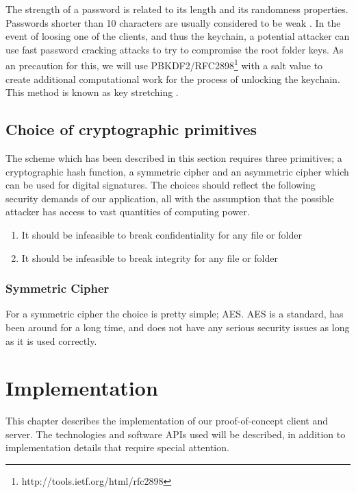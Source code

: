 \documentclass[pdftex,english,10pt,b5paper,twoside]{book}
\begin{document}
The strength of a password is related to its length and its randomness
properties. Passwords shorter than 10 characters are usually considered to be
weak \cite{pbkdf_nist}. In the event of loosing one of the clients, and thus the
keychain, a potential attacker can use fast password cracking attacks to try to
compromise the root folder keys. As an precaution for this, we will use
\ac{PBKDF2}/RFC2898\footnote{http://tools.ietf.org/html/rfc2898} with a salt
value to create additional computational work for the process of unlocking the
keychain. This method is known as key stretching \cite{keystretch}.



\section{Choice of cryptographic primitives}
The scheme which has been described in this section requires three primitives;
a cryptographic hash function, a symmetric cipher and an asymmetric cipher
which can be used for digital signatures. The choices should reflect the
following security demands of our application, all with the assumption that the
possible attacker has access to vast quantities of computing power.

\begin{enumerate}
    \item It should be infeasible to break confidentiality for any file or folder
    \item It should be infeasible to break integrity for any file or folder
\end{enumerate}

\subsection{Symmetric Cipher}
For a symmetric cipher the choice is pretty simple; \ac{AES}. \ac{AES} is
a standard, has been around for a long time, and does not have any serious
security issues as long as it is used correctly.

\chapter{Implementation}
This chapter describes the implementation of our proof-of-concept client and
server. The technologies and software \ac{API}s used will be described, in
addition to implementation details that require special attention.
\end{document}
